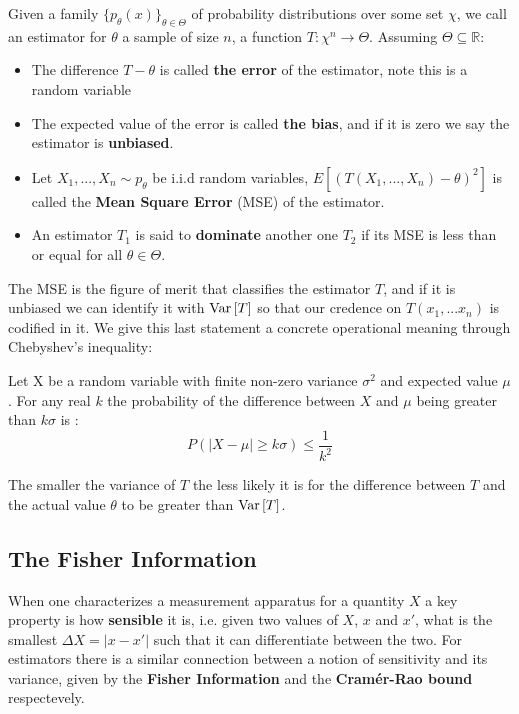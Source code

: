 \begin{definition}
  Given a family $\{p_{\theta}(x)\}_{\theta \in \Theta}$ of probability distributions over some set $\chi$, we call an estimator for $\theta$ a
  sample of size $n$, a function $T:\chi^{n} \to \Theta$. Assuming $\Theta \subseteq \mathds{R}$:
  \begin{itemize}
  \item The difference $T - \theta$ is called \textbf{the error} of the estimator, note this is a random variable
  \item The expected value of the error is called \textbf{the bias}, and if it is zero we say the estimator is \textbf{unbiased}.
  \item Let  $X_{1}, ..., X_{n} \sim p_{\theta}$ be i.i.d random variables, $E[(T(X_{1}, ..., X_{n})-\theta)^{2}]$ is called the \textbf{Mean Square Error} (MSE) of the estimator.
  \item An estimator $T_{1}$ is said to \textbf{dominate} another one $T_{2}$ if its MSE is less than or equal for all $\theta \in \Theta$.

  \end{itemize}
\end{definition}

The MSE is the figure of merit that classifies the estimator $T$, and if it is unbiased we can identify it with $\text{Var}\left[T\right]$ so that
our credence on $T(x_{1}, ... x_{n})$ is codified in it. We give this last statement a concrete operational meaning through
Chebyshev's inequality:

\begin{theorem}
  Let X be a random variable with finite non-zero variance $\sigma^{2}$ and expected value $\mu$. For any real $k$ the probability of the
  difference between $X$ and $\mu$ being greater than $k\sigma$ is \cite{feller1971introduction}:
$$
P(|X-\mu|\geq k\sigma)\leq \frac{1}{k^{2}}
$$
\end{theorem}

The smaller the variance of $T$ the less likely it is for the difference between $T$ and the actual value $\theta$ to be greater than
$\text{Var}\left[T\right]$.

\subsection{The Fisher Information}
When one characterizes a measurement apparatus for a quantity $X$ a key property is how \textbf{sensible} it is, i.e. given two values  of $X$,
$x$ and $x'$, what is the smallest $\Delta X = |x-x'|$ such that it can differentiate between the two. For estimators there is a similar
connection between a notion of sensitivity and its variance, given by the \textbf{Fisher Information} and the \textbf{Cram\'er-Rao bound}
respectevely.

